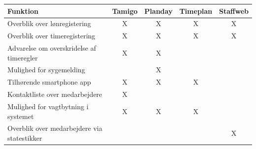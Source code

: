 \begin{table}[h]
\begin{tabular}{@{}lcccc@{}}
\toprule
\textbf{Funktion}                                                & \multicolumn{1}{l}{\textbf{Tamigo}} & \multicolumn{1}{l}{\textbf{Planday}} & \multicolumn{1}{l}{\textbf{Timeplan}} & \multicolumn{1}{l}{\textbf{Staffweb}} \\ \midrule
\multicolumn{1}{l|}{Overblik over lønregistering}                & X                                   & X                                    & X                                     & X                                     \\
\multicolumn{1}{l|}{Overblik over timeregistering}               & X                                   & X                                    & X                                     & X                                     \\
\multicolumn{1}{l|}{Advarelse om overskridelse af timeregler}    & X                                   & X                                    &                                       &                                       \\
\multicolumn{1}{l|}{Mulighed for sygemelding}                    &                                     & X                                    &                                       &                                       \\
\multicolumn{1}{l|}{Tilhørende smartphone app}                   & X                                   & X                                    & X                                     &                                       \\
\multicolumn{1}{l|}{Kontaktliste over medarbejdere}              & X                                   &                                      &                                       &                                       \\
\multicolumn{1}{l|}{Mulighed for vagtbytning i systemet}         & X                                   & X                                    & X                                     &                                       \\
\multicolumn{1}{l|}{Overblik over medarbejdere via statestikker} &                                     &                                      &                                       & X                                     \\

\end{tabular}
\end{table}
